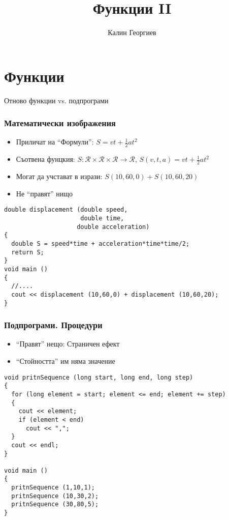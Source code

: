 \documentclass{beamer}
\begin{document}
\title[Увод в програмирането]{Функции II} 
\author{Калин Георгиев} 
\frame{\titlepage} 


\section{Функции} 


\begin{frame}
\centerline{Отново функции vs. подпрограми}
\end{frame}



\begin{frame}[fragile]
\frametitle{Математически изображения}

\begin{itemize}
  \item Приличат на ``Формули'': $S=vt + \frac{1}{2}at^2$
\pause
  \item Съотвена фунцкия: $S:\mathcal{R}\times\mathcal{R}\times\mathcal{R}\rightarrow\mathcal{R}$, $S(v,t,a)=vt + \frac{1}{2}at^2$
\pause
  \item Могат да учстават в изрази: $S(10,60,0) + S(10,60,20)$
\pause
  \item Не ``правят'' нищо 
\end{itemize}
\pause

\begin{flushleft}
\begin{lstlisting}
double displacement (double speed, 
                     double time, 
                    double acceleration)
{
  double S = speed*time + acceleration*time*time/2;
  return S;
}
void main ()
{
  //....
  cout << displacement (10,60,0) + displacement (10,60,20);
}

\end{lstlisting}
  
\end{flushleft}
\end{frame}


\begin{frame}[fragile]
\frametitle{Подпрограми. Процедури}

\begin{itemize}
  \item ``Правят'' нещо: Страничен ефект
  \item ``Стойността'' им няма значение
\end{itemize}



\begin{flushleft}
\begin{lstlisting}
void pritnSequence (long start, long end, long step)
{
  for (long element = start; element <= end; element += step)
  {
    cout << element;
    if (element < end)
      cout << ",";
  }  
  cout << endl;
}

void main ()
{
  pritnSequence (1,10,1);
  pritnSequence (10,30,2);
  pritnSequence (30,80,5);
}
\end{lstlisting}

\end{flushleft}

\end{frame}
\end{document}
